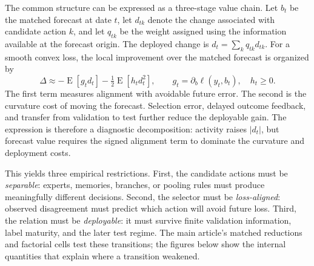 \documentclass[10pt]{article}
\begin{document}
The common structure can be expressed as a three-stage value chain. Let $b_t$
be the matched forecast at date $t$, let $d_{tk}$ denote the change associated
with candidate action $k$, and let $q_{tk}$ be the weight assigned using the
information available at the forecast origin. The deployed change is
$d_t=\sum_k q_{tk}d_{tk}$. For a smooth convex loss, the local improvement over
the matched forecast is organized by
\[
\Delta \approx
-\operatorname{E}[g_t d_t]
-\tfrac12\operatorname{E}[h_t d_t^2],
\qquad
g_t=\partial_b\ell(y_t,b_t),\quad h_t\geq 0.
\]
The first term measures alignment with avoidable future error. The second is
the curvature cost of moving the forecast. Selection error, delayed outcome
feedback, and transfer from validation to test further reduce the deployable
gain. The expression is therefore a diagnostic decomposition: activity raises
$|d_t|$, but forecast value requires the signed alignment term to dominate the
curvature and deployment costs.

This yields three empirical restrictions. First, the candidate actions must be
\emph{separable}: experts, memories, branches, or pooling rules must produce
meaningfully different decisions. Second, the selector must be
\emph{loss-aligned}: observed disagreement must predict which action will avoid
future loss. Third, the relation must be \emph{deployable}: it must survive
finite validation information, label maturity, and the later test regime. The
main article's matched reductions and factorial cells test these transitions;
the figures below show the internal quantities that explain where a transition
weakened.
\end{document}
